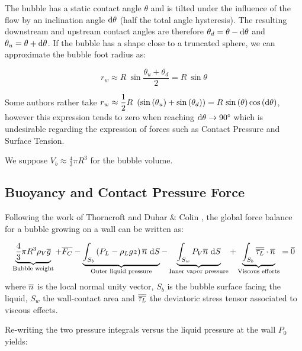 The bubble has a static contact angle $\theta$ and is tilted under the influence of the flow by an inclination angle $\mathrm{d}\theta$ (half the total angle hysteresis). The resulting downstream and upstream contact angles are therefore $\theta_{d}=\theta-\mathrm{d}\theta$ and $\theta_{u}=\theta+\mathrm{d}\theta$. If the bubble has a shape close to a truncated sphere, we can approximate the bubble foot radius as:

\begin{equation}
r_{w} \approx R~ \sin{\frac{\theta_{u}+\theta_{d}}{2}}=R~ \sin{\theta}
\label{eq:rw}
\end{equation}

Some authors rather take $r_{w}\approx \dfrac{1}{2} R~\left( \mathrm{sin}\left( \theta_{u} \right) + \mathrm{sin}\left( \theta_{d} \right)  \right)=R~\mathrm{sin}\left( \theta \right)\mathrm{cos}\left( \mathrm{d}\theta \right)$, however this expression tends to zero when reaching $\mathrm{d}\theta \to 90\degree$ which is undesirable regarding the expression of forces such as Contact Pressure and Surface Tension.


We suppose $V_{b}\approx\frac{4}{3}\pi R^{3}$ for the bubble volume.





\subsection{Buoyancy and Contact Pressure Force}

Following the work of Thorncroft \etal \cite{thorncroft_bubble_2001} and Duhar \& Colin \cite{duhar_dynamics_2006}, the global force balance for a bubble growing on a wall can be written as:

\begin{equation}
\underbrace{ \frac{4}{3} \pi R^{3} \rho_{V} \overline{g}}_{\text{Bubble weight}} + \overline{F_{C}} - \underbrace{ \int_{S_{b}} \left( P_{L} - \rho_{L}gz \right)\overline{n}\ \mathrm{d}S }_{\text{Outer liquid pressure}} - \underbrace{ \int_{S_{w}} P_{V} \overline{n}\ \mathrm{d}S }_{\text{Inner vapor pressure}} + \underbrace{ \int_{S_{b}} \overline{\overline{\tau_{L}}}\cdot \overline{n} }_{\text{Viscous efforts}} = \overline{0}
\end{equation}
where $\overline{n}$ is the local normal unity vector, $S_{b}$ is the bubble surface facing the liquid, $S_{w}$ the wall-contact area and $\overline{\overline{\tau_{L}}}$ the deviatoric stress tensor associated to viscous effects.

\npar

Re-writing the two pressure integrals versus the liquid pressure at the wall $P_{0}$ yields:

